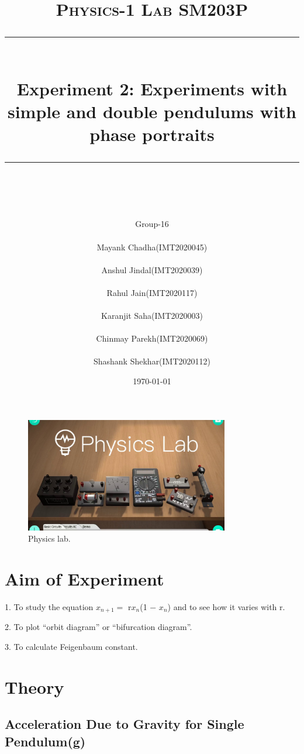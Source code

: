\documentclass[11pt]{scrartcl} %
\title{	
	\normalfont\normalsize
	\textsc{\Huge Physics-1 Lab SM203P}\\ %
	\vspace{25pt} %
	\rule{\linewidth}{0.5pt}\\ %
	\vspace{20pt} %
	{\huge Experiment 2: Experiments with simple and double pendulums with phase portraits}\\ %
	\vspace{12pt} %
	\rule{\linewidth}{2pt}\\ %
	\vspace{12pt} %
}
\author{\Huge Group-16\\
\\
\LARGE Mayank Chadha(IMT2020045)\\
\\
\LARGE Anshul Jindal(IMT2020039)\\
\\
\LARGE Rahul Jain(IMT2020117)\\
\\
\LARGE Karanjit Saha(IMT2020003)\\
\\
\LARGE Chinmay Parekh(IMT2020069)\\
\\
\LARGE Shashank Shekhar(IMT2020112)} %
\date{\normalsize\today} %
\begin{document}
\maketitle %

\begin{figure}[h] %
	\centering
	\includegraphics[width=\textwidth, height=5cm]{first.jpg} %
	\caption{Physics lab.}
\end{figure}

\section{Aim of Experiment}
1. To study the equation $x_{n+1} =$ r$x_n$(1 − $x_n$) and to see how it varies with r.\par
2.  To plot “orbit diagram” or “bifurcation diagram”. \par
3. To calculate Feigenbaum constant.  \par





\section{Theory}


\subsection{Acceleration Due to Gravity for Single Pendulum(g)}
\end{document}
